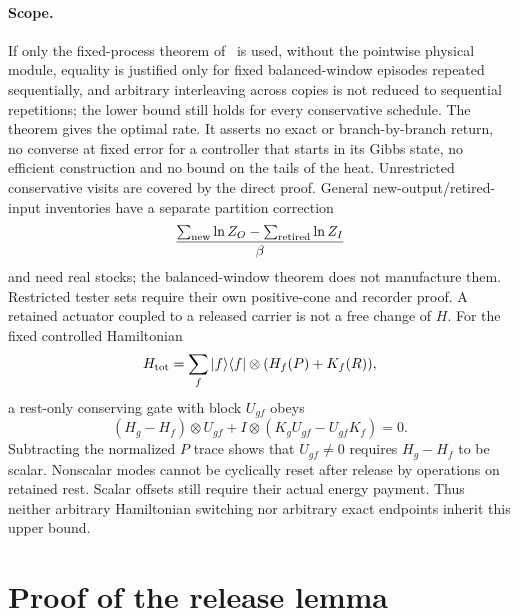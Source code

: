\documentclass[11pt]{article}
\theoremstyle{definition}
\theoremstyle{remark}
\begin{document}
\paragraph{Scope.}
If only the fixed-process theorem of~\cite{Answering} is used, without the pointwise physical module, equality is justified only for fixed balanced-window episodes repeated sequentially, and arbitrary interleaving across copies is not reduced to sequential repetitions; the lower bound still holds for every conservative schedule. The theorem gives the optimal rate. It asserts no exact or branch-by-branch return, no converse at fixed error for a controller that starts in its Gibbs state, no efficient construction and no bound on the tails of the heat. Unrestricted conservative visits are covered by the direct proof. General new-output/retired-input inventories have a separate partition correction
\[
\frac{\sum_{\rm new}\ln Z_O-\sum_{\rm retired}\ln Z_I}{\beta}
\]
and need real stocks; the balanced-window theorem does not manufacture them. Restricted tester sets require their own positive-cone and recorder proof. A retained actuator coupled to a released carrier is not a free change of $H$. For the fixed controlled Hamiltonian
\[
H_{\rm tot}=\sum_f|f\rangle\langle f|\otimes(H_f(P)+K_f(R)),
\]
a rest-only conserving gate with block $U_{gf}$ obeys
\[
(H_g-H_f)\otimes U_{gf}+I\otimes(K_gU_{gf}-U_{gf}K_f)=0.
\]
Subtracting the normalized $P$ trace shows that $U_{gf}\ne0$ requires $H_g-H_f$ to be scalar. Nonscalar modes cannot be cyclically reset after release by operations on retained rest. Scalar offsets still require their actual energy payment. Thus neither arbitrary Hamiltonian switching nor arbitrary exact endpoints inherit this upper bound.

\section{Proof of the release lemma}\label{app:release}
\end{document}
